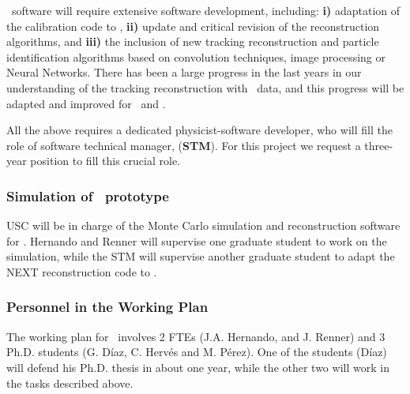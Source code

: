 \Next\ software will require extensive software development, including: {\bf i)}  adaptation of the calibration code to \Next, {\bf ii)}  update and critical revision of the reconstruction algorithms, and {\bf iii)}  the inclusion of new tracking reconstruction and particle identification algorithms based on convolution techniques, image processing or Neural Networks. There has been a large progress in the last years in our understanding of the tracking reconstruction with \NEW\ data, and this progress will be adapted and improved for \NEXT\ and \NHD.

All the above requires a dedicated physicist-software developer, who will fill the role of software technical manager, ({\bf STM}). For this project we request a three-year position to fill this crucial role. 

\subsubsection{Simulation of \HDEMO\ prototype}


USC will be in charge of the Monte Carlo simulation and reconstruction software for \HDEMO. Hernando and Renner will supervise one graduate student to work on the simulation, while the STM will supervise another graduate student to adapt the NEXT reconstruction code to \HDEMO. 

\subsubsection*{Personnel in the Working Plan}

The working plan for \sUSC\ involves 2 FTEs (J.A. Hernando, and J. Renner) and 3 Ph.D. students (G. Díaz, C. Hervés and M. Pérez). One of the students (D\'iaz) will defend his Ph.D. thesis in about one year, while the other two will work in the tasks described above. 

